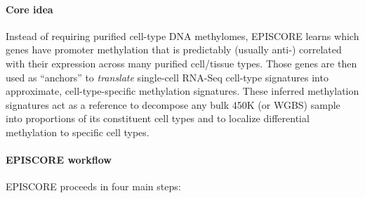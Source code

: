 \documentclass[10pt]{extarticle}
\begin{document}
\paragraph{Core idea}
Instead of requiring purified cell-type DNA methylomes, EPISCORE learns which genes have promoter methylation that is predictably (usually anti-) correlated with their expression across many purified cell/tissue types. Those genes are then used as ``anchors'' to \textit{translate} single-cell RNA-Seq cell-type signatures into approximate, cell-type-specific methylation signatures. These inferred methylation signatures act as a reference to decompose any bulk 450K (or WGBS) sample into proportions of its constituent cell types and to localize differential methylation to specific cell types.

\paragraph{EPISCORE workflow}
EPISCORE proceeds in four main steps:
\end{document}
